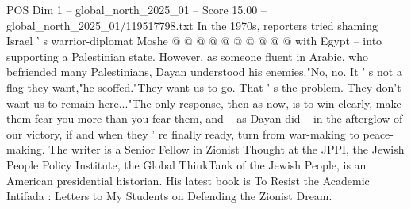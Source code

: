 \begin{textsample}{POS Dim 1 – global\_north\_2025\_01 – Score 15.00 – global\_north\_2025\_01/119517798.txt}
In the 1970s, reporters tried shaming Israel ' s warrior-diplomat Moshe @ @ @ @ @ @ @ @ @ @ with Egypt -- into supporting a Palestinian state.
However, as someone fluent in Arabic, who befriended many Palestinians, Dayan understood his enemies."No, no.
It ' s not a flag they want,"he scoffed."They want us to go.
That ' s the problem.
They don't want us to remain here..."The only response, then as now, is to win clearly, make them fear you more than you fear them, and -- as Dayan did -- in the afterglow of our victory, if and when they ' re finally ready, turn from war-making to peace-making.
The writer is a Senior Fellow in Zionist Thought at the JPPI, the Jewish People Policy Institute, the Global ThinkTank of the Jewish People, is an American presidential historian.
His latest book is To Resist the Academic Intifada : Letters to My Students on Defending the Zionist Dream.

\end{textsample}
